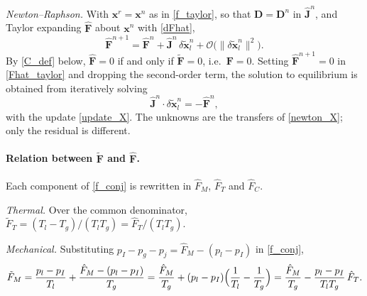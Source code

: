 \emph{Newton--Raphson.} With $\boldsymbol{x}^r=\boldsymbol{x}^n$ as in \eqref{f_taylor}, so that $\boldsymbol{D}=\boldsymbol{D}^n$ in $\hat{\boldsymbol{J}}^n$, and Taylor expanding $\hat{\boldsymbol{F}}$ about $\boldsymbol{x}^n$ with \eqref{dFhat},
\begin{equation}\label{Fhat_taylor}
\hat{\boldsymbol{F}}^{n+1}=\hat{\boldsymbol{F}}^n+\hat{\boldsymbol{J}}^n\,\delta\tilde{\boldsymbol{x}}_l^n+\mathcal{O}\bigl(\lVert\delta\tilde{\boldsymbol{x}}_l^n\rVert^2\bigr).
\end{equation}
By \eqref{C_def} below, $\hat{\boldsymbol{F}}=0$ if and only if $\tilde{\boldsymbol{F}}=0$, i.e.\ $\boldsymbol{F}=0$. Setting $\hat{\boldsymbol{F}}^{n+1}=0$ in \eqref{Fhat_taylor} and dropping the second-order term, the solution to equilibrium is obtained from iteratively solving
\begin{equation}\label{newton_hat}
\hat{\boldsymbol{J}}^n\cdot\delta\tilde{\boldsymbol{x}}_l^n=-\hat{\boldsymbol{F}}^n,
\end{equation}
with the update \eqref{update_X}. The unknowns are the transfers of \eqref{newton_X}; only the residual is different.

\paragraph{Relation between $\tilde{\boldsymbol{F}}$ and $\hat{\boldsymbol{F}}$.}
Each component of \eqref{f_conj} is rewritten in $\hat{F}_M$, $\hat{F}_T$ and $\hat{F}_C$.

\emph{Thermal.} Over the common denominator, $\tilde{F}_T=(T_l-T_g)/(T_lT_g)=\hat{F}_T/(T_lT_g)$.

\emph{Mechanical.} Substituting $p_I-p_g-p_{j}=\hat{F}_M-(p_l-p_I)$ in \eqref{f_conj},
\begin{equation}
\tilde{F}_M=\frac{p_l-p_I}{T_l}+\frac{\hat{F}_M-(p_l-p_I)}{T_g}=\frac{\hat{F}_M}{T_g}+(p_l-p_I)\Bigl(\frac1{T_l}-\frac1{T_g}\Bigr)=\frac{\hat{F}_M}{T_g}-\frac{p_l-p_I}{T_lT_g}\,\hat{F}_T .
\end{equation}


